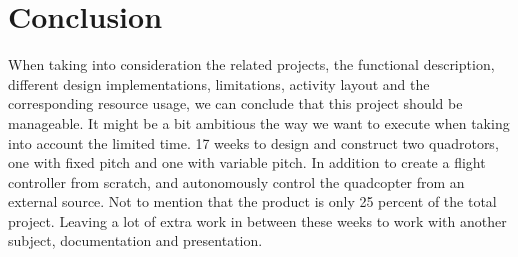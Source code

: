 \section{Conclusion}

When taking into consideration the related projects, the functional description, different design implementations, limitations, activity layout and the corresponding resource usage, we can conclude that this project should be manageable. It might be a bit ambitious the way we want to execute when taking into account the limited time. 17 weeks to design and  construct two quadrotors, one with fixed pitch and one with variable pitch. In addition to create a flight controller from scratch, and autonomously control the quadcopter from an external source. Not to mention that the product is only 25 percent of the total project. Leaving a lot of extra work in between these weeks to work with another subject, documentation and presentation. \\